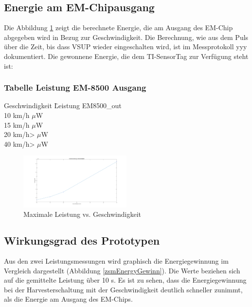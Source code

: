 \newpage  %

\subsection{Energie am EM-Chipausgang}

Die Abbildung \ref{energie_resultat_harvester} zeigt die berechnete Energie, die am Ausgang des EM-Chip abgegeben wird in Bezug zur Geschwindigkeit. Die Berechnung, wie aus dem Puls über die Zeit, bis dass VSUP wieder eingeschalten wird, ist im  Messprotokoll yyy dokumentiert. Die gewonnene Energie, die dem TI-SensorTag zur Verfügung steht ist:

\subsubsection*{Tabelle Leistung EM-8500 Ausgang}
\label{res_em_aus}
\begin{tabbing}
    Geschwindigkeit \quad\= Leistung EM8500\_out \\[0.8ex]
    10 km/h     $\mu$W\\
    15 km/h    $\mu$W\\
    20 km/h>   $\mu$W\\
    40 km/h>  $\mu$W\\
\end{tabbing}  


\begin{figure}[ht]
    \includegraphics[width=0.5\textwidth]{4Resultate/imag/ResultatLeistungGeschwindigkeit.png} 
    \caption{Maximale Leistung vs. Geschwindigkeit}
    \label{energie_resultat_harvester}
\end{figure}

\subsection{Wirkungsgrad des Prototypen}

Aus den zwei Leistungsmessungen wird graphisch die Energiegewinnung im Vergleich dargestellt (Abbildung \ref{zsmEnergyGewinn}). Die Werte beziehen sich auf die gemittelte Leistung über 10 s. Es ist zu sehen, dass die Energiegewinnung bei der Harvesterschaltung mit der Geschwindigkeit deutlich schneller zunimmt, als die Energie am Ausgang des EM-Chips. 

